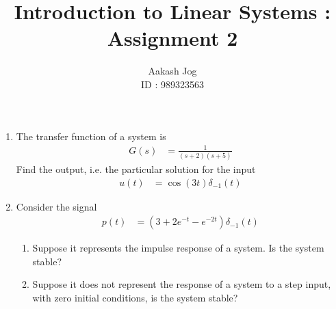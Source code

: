 \documentclass[fleqn, a4paper, 11pt, oneside]{amsart}
\title{Introduction to Linear Systems : Assignment 2}
\author
{
	Aakash Jog\\
	ID : 989323563
}
\date{\formatdate{29}{10}{2015}}
\theoremstyle{definition}
\theoremstyle{theorem}
\begin{document}

\maketitle

\begin{question}
	\begin{enumerate}
		\item
			The transfer function of a system is
			\begin{align*}
				G(s) & = \frac{1}{(s + 2) (s + 5)}
			\end{align*}
			Find the output, i.e. the particular solution for the input
			\begin{align*}
				u(t) & = \cos(3 t) \delta_{-1}(t)
			\end{align*}
		\item
			Consider the signal
			\begin{align*}
				p(t) & = \left( 3 + 2 e^{-t} - e^{-2 t} \right) \delta_{-1}(t)
			\end{align*}
			\begin{enumerate}
				\item
					Suppose it represents the impulse response of a system.
					Is the system stable?
				\item
					Suppose it does not represent the response of a system to a step input, with zero initial conditions, is the system stable?
			\end{enumerate}
	\end{enumerate}
\end{question}
\end{document}
